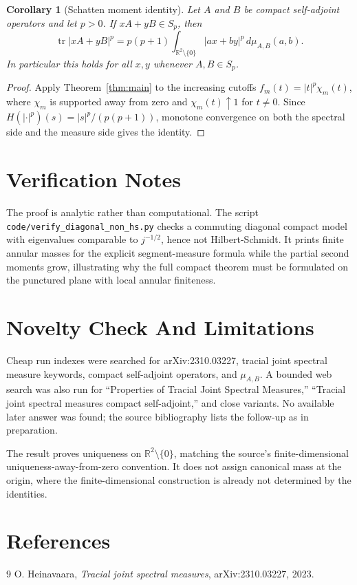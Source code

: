 \documentclass[11pt]{article}
\newtheorem{corollary}{Corollary}
\newcommand{\R}{\mathbb R}
\newcommand{\tr}{\operatorname{tr}}
\begin{document}
\begin{corollary}[Schatten moment identity]\label{cor:schatten}
Let $A$ and $B$ be compact self-adjoint operators and let
$p>0$.  If $xA+yB\in S_p$, then
\[
  \tr |xA+yB|^p
  =p(p+1)\int_{\R^2\setminus\{0\}} |ax+by|^p\,d\mu_{A,B}(a,b).
\]
In particular this holds for all $x,y$ whenever $A,B\in S_p$.
\end{corollary}

\begin{proof}
Apply Theorem~\ref{thm:main} to the increasing cutoffs
$f_m(t)=|t|^p\chi_m(t)$, where $\chi_m$ is supported away from zero and
$\chi_m(t)\uparrow1$ for $t\ne0$.  Since
$H(|\cdot|^p)(s)=|s|^p/(p(p+1))$, monotone convergence on both the spectral
side and the measure side gives the identity.
\end{proof}

\section*{Verification Notes}

The proof is analytic rather than computational.  The script
\texttt{code/verify\_diagonal\_non\_hs.py} checks a commuting diagonal compact
model with eigenvalues comparable to $j^{-1/2}$, hence not Hilbert-Schmidt.  It
prints finite annular masses for the explicit segment-measure formula while
the partial second moments grow, illustrating why the full compact theorem
must be formulated on the punctured plane with local annular finiteness.

\section*{Novelty Check And Limitations}

Cheap run indexes were searched for arXiv:2310.03227, tracial joint spectral
measure keywords, compact self-adjoint operators, and $\mu_{A,B}$.  A bounded
web search was also run for ``Properties of Tracial Joint Spectral Measures,''
``Tracial joint spectral measures compact self-adjoint,'' and close variants.
No available later answer was found; the source bibliography lists the
follow-up as in preparation.

The result proves uniqueness on $\R^2\setminus\{0\}$, matching the source's
finite-dimensional uniqueness-away-from-zero convention.  It does not assign
canonical mass at the origin, where the finite-dimensional construction is
already not determined by the identities.

\section*{References}

\begin{thebibliography}{9}
O. Heinavaara, \emph{Tracial joint spectral measures}, arXiv:2310.03227,
2023.
\end{thebibliography}
\end{document}
